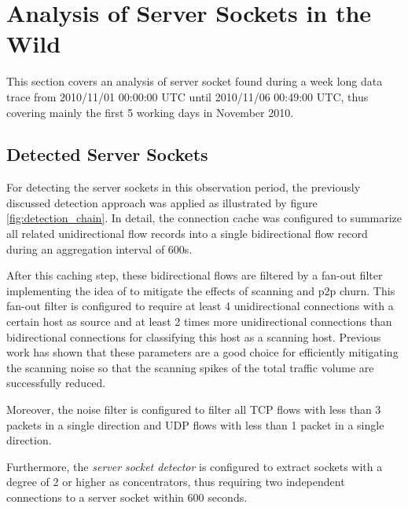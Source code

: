 \section{Analysis of Server Sockets in the Wild}

This section covers an analysis of \gls{server socket} found during a
week long data trace from 2010/11/01 00:00:00 UTC until 2010/11/06 00:49:00 UTC,
thus covering mainly the first 5 working days in November 2010.

\subsection{Detected Server Sockets}

For detecting the \glspl{server socket} in this observation period, the
previously discussed detection approach was applied as illustrated by figure
\ref{fig:detection_chain}. In detail, the connection cache was configured to
summarize all related unidirectional flow records into a single bidirectional
flow record during an aggregation interval of 600s.

After this caching step, these bidirectional flows are filtered by a fan-out
filter implementing the idea of \citet{Allman:2007} to mitigate the effects of
scanning and \gls{p2p} churn. This fan-out filter is configured to require at
least 4 unidirectional connections with a certain host as source and at least 2
times more unidirectional connections than bidirectional connections for
classifying this host as a scanning host.
Previous work\citep{Schatzmann:Mining,Schatzmann:Dissection, Schatzmann:Tracing}
has shown that these parameters are a good choice for efficiently mitigating the
scanning noise so that the scanning spikes of the total traffic volume are
successfully reduced.

Moreover, the noise filter is configured to filter all \gls{TCP} flows with less
than 3 packets in a single direction and \gls{UDP} flows with less than 1 packet
in a single direction.

Furthermore, the \emph{server socket detector} is configured to extract sockets
with a degree of 2 or higher as concentrators, thus requiring two independent
connections to a \gls{server socket} within 600 seconds.

